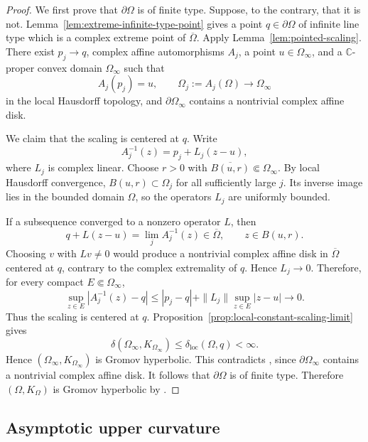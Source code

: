 \documentclass[11pt]{article}
\theoremstyle{definition}
\newcommand{\C}{\mathbb{C}}
\begin{document}
\begin{proof}
We first prove that $\partial\Omega$ is of finite type. Suppose, to
the contrary, that it is not. Lemma~\ref{lem:extreme-infinite-type-point} gives a point
$q\in\partial\Omega$ of infinite line type which is a complex extreme
point of $\overline\Omega$. Apply Lemma~\ref{lem:pointed-scaling}.
There exist $p_j\to q$, complex affine automorphisms $A_j$, a point
$u\in\Omega_\infty$, and a $\C$-proper convex domain $\Omega_\infty$
such that
\[
  A_j(p_j)=u,\qquad \Omega_j:=A_j(\Omega)\longrightarrow\Omega_\infty
\]
in the local Hausdorff topology, and $\partial\Omega_\infty$ contains
a nontrivial complex affine disk.

We claim that the scaling is centered at $q$. Write
\[
  A_j^{-1}(z)=p_j+L_j(z-u),
\]
where $L_j$ is complex linear. Choose $r>0$ with
$\overline{B(u,r)}\Subset\Omega_\infty$. By local Hausdorff
convergence, $B(u,r)\subset\Omega_j$ for all sufficiently large $j$.
Its inverse image lies in the bounded domain $\Omega$, so the
operators $L_j$ are uniformly bounded.

If a subsequence converged to a nonzero operator $L$, then
\[
  q+L(z-u)=\lim_j A_j^{-1}(z)\in\overline\Omega,
  \qquad z\in B(u,r).
\]
Choosing $v$ with $Lv\ne0$ would produce a nontrivial complex affine
disk in $\overline\Omega$ centered at $q$, contrary to the complex
extremality of $q$. Hence $L_j\to0$. Therefore, for every compact
$E\Subset\Omega_\infty$,
\[
  \sup_{z\in E}|A_j^{-1}(z)-q|
  \le |p_j-q|+\|L_j\|\sup_{z\in E}|z-u|
  \longrightarrow0.
\]
Thus the scaling is centered at $q$. Proposition~\ref{prop:local-constant-scaling-limit} gives
\[
  \delta(\Omega_\infty,K_{\Omega_\infty})
  \le \delta_{\mathrm{loc}}(\Omega,q)<\infty.
\]
Hence $(\Omega_\infty,K_{\Omega_\infty})$ is Gromov hyperbolic. This
contradicts \cite[Theorem~3.1]{ZimmerFiniteType}, since
$\partial\Omega_\infty$ contains a nontrivial complex affine disk.
It follows that $\partial\Omega$ is of finite type. Therefore
$(\Omega,K_\Omega)$ is Gromov hyperbolic by
\cite[Theorem~1.1]{ZimmerFiniteType}.
\end{proof}




















\subsection{Asymptotic upper curvature}
\end{document}
